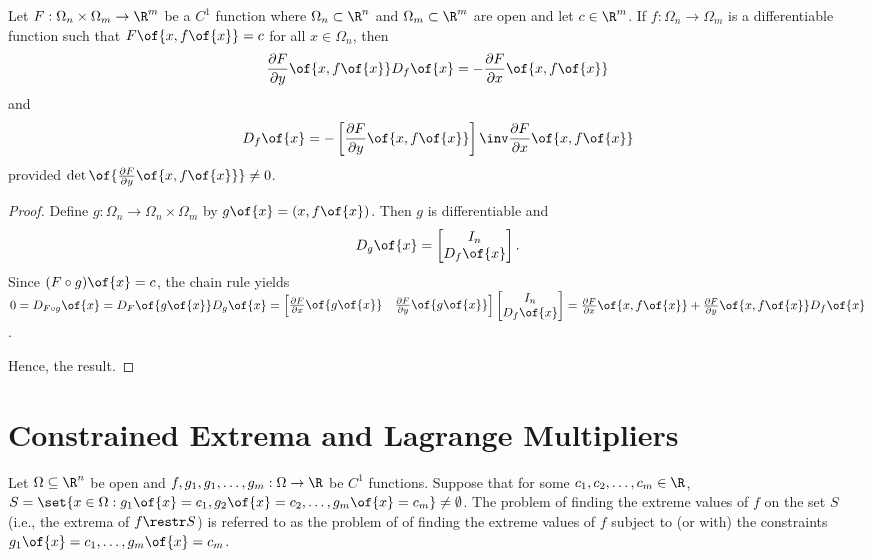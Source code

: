 \begin{proposition}
    Let $F: \Omega_n \times \Omega_m \to \R^m$ be a $C^1$ function where $\Omega_n \subset \R^n$ and $\Omega_m \subset \R^m$ are open and let $c \in \R^m$. If $f: \Omega_n \to \Omega_m$ is a differentiable function such that $F\of{x, f\of{x}} = c$ for all $x \in \Omega_n$, then
    \[\frac{\partial F}{\partial y}\of{x, f\of{x}} D_f\of{x} = -\frac{\partial F}{\partial x}\of{x, f\of{x}}\]
    and
    \[D_f\of{x} = -\left[\frac{\partial F}{\partial y}\of{x, f\of{x}}\right]\inv \frac{\partial F}{\partial x}\of{x, f\of{x}}\]
    provided $\det \of{\frac{\partial F}{\partial y}\of{x, f\of{x}}} \neq 0$.
\end{proposition}
\begin{proof}
    Define $g: \Omega_n \to \Omega_n \times \Omega_m$ by $g\of{x} = \left(x, f\of{x}\right)$. Then $g$ is differentiable and 
    \[D_g \of{x} = \begin{bmatrix} I_n \\ D_f\of{x} \end{bmatrix}.\]
    Since $(F \circ g)\of{x} = c$, the chain rule yields $0 = D_{F \circ g}\of{x} = D_F\of{g\of{x}} D_g\of{x} = \begin{bmatrix} \frac{\partial F}{\partial x}\of{g\of{x}} & \frac{\partial F}{\partial y}\of{g\of{x}} \end{bmatrix} \begin{bmatrix} I_n \\ D_f\of{x} \end{bmatrix} = \frac{\partial F}{\partial x}\of{x, f\of{x}} + \frac{\partial F}{\partial y}\of{x, f\of{x}} D_f\of{x}$.

    Hence, the result.
\end{proof}

\section{Constrained Extrema and Lagrange Multipliers}

Let $\Omega \subseteq \R^n$ be open and $f, g_1, g_1, \dots, g_m: \Omega \to \R$ be $C^1$ functions. Suppose that for some $c_1, c_2, \dots, c_m \in \R$, $S = \set{x \in \Omega: g_1\of{x} = c_1, g_2\of{x} = c_2, \dots, g_m\of{x} = c_m} \neq \emptyset$. The problem of finding the extreme values of $f$ on the set $S$ (i.e., the extrema of $f \restr S$) is referred to as the problem of of finding the extreme values of $f$ subject to (or with) the constraints $g_1\of{x} = c_1, \dots, g_m\of{x} = c_m$.


